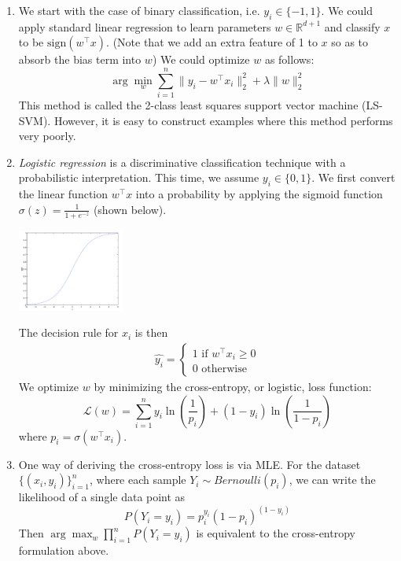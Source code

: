\documentclass[10pt]{article}
\begin{document}
\begin{multicols}{2}
\begin{addmargin}[0.8em]{0.5em}
\begin{enumerate}[label=(\alph*)]
        \item We start with the case of binary classification, i.e. $y_i \in \{-1, 1\}$. We could apply standard linear regression to learn parameters $w \in \mathbb{R}^{d+1}$ and classify $x$ to be $\text{sign}(w^\top x)$. (Note that we add an extra feature of 1 to $x$ so as to absorb the bias term into $w$) We could optimize $w$ as follows:
        $$
        \arg\min_w \sum_{i=1}^n \| y_i - w^\top x_i \|_2^2 + \lambda \| w \|_2^2
        $$
        This method is called the 2-class least squares support vector machine (LS-SVM). However, it is easy to construct examples where this method performs very poorly. 
        \item \textit{Logistic regression} is a discriminative classification technique with a probabilistic interpretation. This time, we assume $y_i \in \{0, 1\}$. We first convert the linear function $w^\top x$ into a probability by applying the sigmoid function $\sigma(z) = \frac{1}{1+e^{-z}}$ (shown below).
        \begin{center}
            \includegraphics[width=3.5cm]{sigmoid.png}
        \end{center}
        The decision rule for $x_i$ is then
        \begin{align*}
            \hat{y_i} = 
            \begin{cases}
            1 \text{ if $w^\top x_i \geq 0$} \\
            0 \text{ otherwise}
            \end{cases}
        \end{align*}
        We optimize $w$ by minimizing the cross-entropy, or logistic, loss function:
        $$
        \mathcal{L}(w) = \sum_{i=1}^n  y_i \ln \left( \frac{1}{p_i} \right) + (1 - y_i) \ln \left( \frac{1}{1 - p_i} \right)
        $$
        where $p_i = \sigma(w^\top x_i)$.
        \item One way of deriving the cross-entropy loss is via MLE. For the dataset $\{ (x_i, y_i) \}_{i=1}^{n}$, where each sample $Y_i \sim \textit{Bernoulli}(p_i)$, we can write the likelihood of a single data point as $$P(Y_i = y_i) = p_i^{y_i} (1 - p_i)^{(1-y_i)}$$
        Then $\arg\max_w \prod_{i=1}^{n} P(Y_i = y_i)$ is equivalent to the cross-entropy formulation above.
        

\end{enumerate}
\end{addmargin}
\end{multicols}
\end{document}
